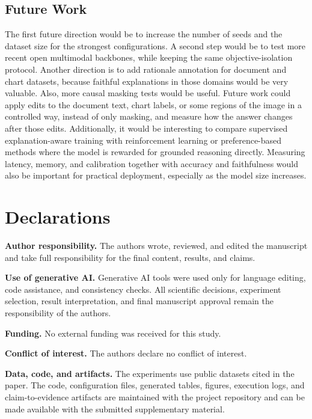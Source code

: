 \documentclass[12pt,bibliography=totoc,listof=totoc,BCOR=5mm,DIV=12,oneside,open=any]{scrbook}
\begin{document}
\section{Future Work}
The first future direction would be to increase the number of seeds and the dataset size for the strongest configurations.
A second step would be to test more recent open multimodal backbones, while keeping the same objective-isolation protocol.
Another direction is to add rationale annotation for document and chart datasets, because faithful explanations in those domains would be very valuable.
Also, more causal masking tests would be useful.
Future work could apply edits to the document text, chart labels, or some regions of the image in a controlled way, instead of only masking, and measure how the answer changes after those edits.
Additionally, it would be interesting to compare supervised explanation-aware training with reinforcement learning or preference-based methods where the model is rewarded for grounded reasoning directly.
Measuring latency, memory, and calibration together with accuracy and faithfulness would also be important for practical deployment, especially as the model size increases.

\backmatter %
    \chapter*{Declarations}
\textbf{Author responsibility.}
The authors wrote, reviewed, and edited the manuscript and take full responsibility for the final content, results, and claims.

\textbf{Use of generative AI.}
Generative AI tools were used only for language editing, code assistance, and consistency checks.
All scientific decisions, experiment selection, result interpretation, and final manuscript approval remain the responsibility of the authors.

\textbf{Funding.}
No external funding was received for this study.

\textbf{Conflict of interest.}
The authors declare no conflict of interest.

\textbf{Data, code, and artifacts.}
The experiments use public datasets cited in the paper.
The code, configuration files, generated tables, figures, execution logs, and claim-to-evidence artifacts are maintained with the project repository and can be made available with the submitted supplementary material.

    
    
\end{document}
